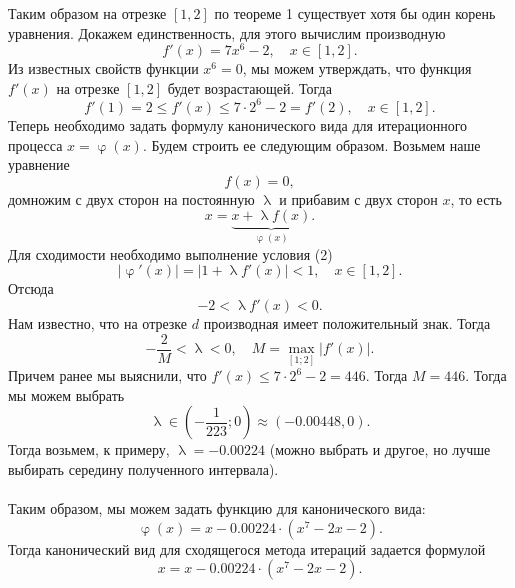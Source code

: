 \documentclass[a4paper, 12pt]{article}
\renewcommand{\leq}{\leqslant}
\renewcommand{\varphi}{\upvarphi}
\renewcommand{\lambda}{\uplambda}
\begin{document}
	Таким образом на отрезке $[1, 2]$ по теореме 1 существует хотя бы один корень уравнения. Докажем единственность, для этого вычислим производную $$f'(x) = 7x^6 - 2,\quad x \in [1,2].$$
	Из известных свойств функции $x^6=0$, мы можем утверждать, что функция $f'(x)$ на отрезке $[1,2]$ будет возрастающей. Тогда $$f'(1) = 2 \leq f'(x) \leq 7\cdot 2^6 -2 = f'(2),\quad x \in [1,2].$$
	Теперь необходимо задать формулу канонического вида для итерационного процесса $x = \varphi(x)$. Будем строить ее следующим образом. Возьмем наше уравнение $$f(x) = 0,$$ домножим с двух сторон на постоянную $\lambda$ и прибавим с двух сторон $x$, то есть $$x = \underbrace{x + \lambda f(x)}_{\varphi(x)}.$$ Для сходимости необходимо выполнение условия (2) $$|\varphi'(x)| = |1 + \lambda f'(x)| < 1,\quad x \in [1,2].$$
	Отсюда $$-2< \lambda f'(x)< 0.$$ Нам известно, что на отрезке $d$ производная имеет положительный знак. Тогда $$-\dfrac{2}{M} < \lambda < 0,\quad M = \max_{[1; 2]}|f'(x)|.$$
	Причем ранее мы выяснили, что $f'(x) \leq 7\cdot 2^6 - 2 = 446$. Тогда $M = 446.$
	Тогда мы можем выбрать $$\lambda \in (-\dfrac{1}{223}; 0) \approx (-0.00448, 0).$$ Тогда возьмем, к примеру, $\lambda = -0.00224$ (можно выбрать и другое, но лучше выбирать середину полученного интервала).\\\\
	Таким образом, мы можем задать функцию для канонического вида: $$\varphi(x) = x -0.00224 \cdot (x^7 - 2x - 2).$$
	Тогда канонический вид для сходящегося метода итераций задается формулой $$x =  x -0.00224 \cdot (x^7 - 2x - 2).$$
\end{document}
